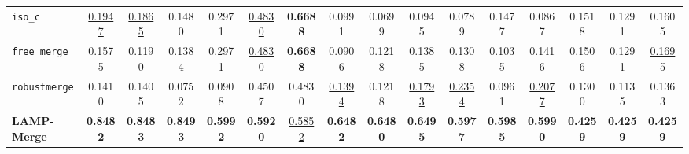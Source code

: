 \documentclass[letterpaper]{article} %
\begin{document}
\begin{table}[t]
{\begin{tabular}{lccccccccccccccc}
\texttt{iso\_c} & \underline{0.1947} & \underline{0.1865} & 0.1480 & 0.2971 & \underline{0.4830} & \textbf{0.6688} & 0.0991 & 0.0699 & 0.0945 & 0.0789 & 0.1477 & 0.0867 & 0.1518 & 0.1291 & 0.1605 \\
\texttt{free\_merge} & 0.1575 & 0.1190 & 0.1384 & 0.2971 & \underline{0.4830} & \textbf{0.6688} & 0.0906 & 0.1218 & 0.1385 & 0.1308 & 0.1035 & 0.1416 & 0.1506 & 0.1291 & \underline{0.1695} \\
\texttt{robustmerge} & 0.1410 & 0.1405 & 0.0752 & 0.0908 & 0.4507 & 0.4830 & \underline{0.1394} & 0.1218 & \underline{0.1793} & \underline{0.2354} & 0.0961 & \underline{0.2077} & 0.1300 & 0.1135 & 0.1363 \\
\textbf{LAMP-Merge} & \textbf{0.8482} & \textbf{0.8483} & \textbf{0.8493} & \textbf{0.5992} & \textbf{0.5920} & \underline{0.5852} & \textbf{0.6482} & \textbf{0.6480} & \textbf{0.6495} & \textbf{0.5977} & \textbf{0.5985} & \textbf{0.5990} & \textbf{0.4259} & \textbf{0.4259} & \textbf{0.4259} \\
\hline
\end{tabular}
}
\end{table}
\end{document}
